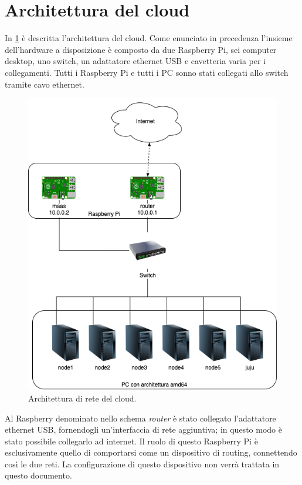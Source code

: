 \section{Architettura del cloud}\label{sec:prog_cloud_architettura}

In \cref{fig:network_architecture} è descritta l'architettura del cloud. Come enunciato in precedenza l'insieme dell'hardware a disposizione è composto da due Raspberry Pi, sei computer desktop, uno switch, un adattatore ethernet USB e cavetteria varia per i collegamenti. 
% 
Tutti i Raspberry Pi e tutti i PC sonno stati collegati allo switch tramite cavo ethernet.

\begin{figure}[H]
    \centering
    \includegraphics[width=0.8\linewidth]{tesi/files/immagini/network_architecture.png}
    \caption{Architettura di rete del cloud.}
    \label{fig:network_architecture}
\end{figure}

\noindent
Al Raspberry denominato nello schema \emph{router} è stato collegato l'adattatore ethernet USB, fornendogli un'interfaccia di rete aggiuntiva; in questo modo è stato possibile collegarlo ad internet.
% 
Il ruolo di questo Raspberry Pi è esclusivamente quello di comportarsi come un dispositivo di routing, connettendo così le due reti.
% 
La configurazione di questo dispositivo non verrà trattata in questo documento.

